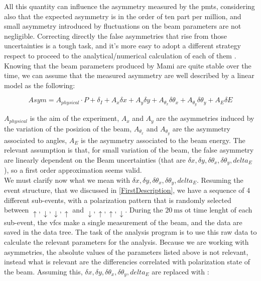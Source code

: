 All this quantity can influence the asymmetry measured by the pmts, considering also that the expected asymmetry is in the order of ten part per million, and small asymmetry introduced by fluctuations on the beam parameters are not negligible. Correcting directly the false asymmetries that rise from those uncertainties is a tough task, and it's more easy to adopt a different strategy respect to proceed to the analytical/numerical calculation of each of them . Knowing that the beam parameters produced by Mami are quite stable over the time, we can assume that the measured asymmetry are well described by a linear model as the following:

\begin{equation}
Asym = A_{physical} \cdot P + \delta_{I} + A_{x} \delta x + A_{y} \delta y + A_{\theta_{x}} \delta \theta_{x} + A_{\theta_{y}} \delta \theta_{y}+ A_{E} \delta E 
\end{equation}

$A_{physical}$ is the aim of the experiment, $A_{x}$ and $A_{y}$ are the asymmetries induced by the variation of the posizion of the beam, $A_{\theta_{x}}$ and $A_{\theta_{y}}$ are the asymmetry associated to angles, $A_{E}$ is the asymmetry associated to the beam energy. 
The relevant assumption is that, for small variation of the beam, the false asymmetry are linearly dependent on the Beam uncertainties (that are $\delta x, \delta y, \delta \theta_{x}, \delta \theta_{y}, delta_{E}$), so a first order approximation seems valid.\\
We must clarify now what we mean with $\delta x, \delta y, \delta \theta_{x}, \delta \theta_{y}, delta_{E}$. Resuming the event structure, that we discussed in \ref{FirstDescription}, we have a sequence of 4 different sub-events, with a polarization pattern that is randomly selected between $\uparrow,\downarrow,\downarrow, \uparrow$ and $\downarrow,\uparrow,\uparrow,\downarrow$. During the $\SI{20}{\milli \second}$ ot time lenght of each sub-event, the vfcs make a single measurement of the beam, and the data are saved in the data tree. The task of the analysis program is to use this raw data to calculate the relevant parameters for the analysis. Because we are working with asymmetries, the absolute values of the parameters listed above is not relevant, instead what is relevant are the differencies correlated with polarization state of the beam. Assuming this, $\delta x, \delta y, \delta \theta_{x}, \delta \theta_{y}, delta_{E}$ are replaced with :

